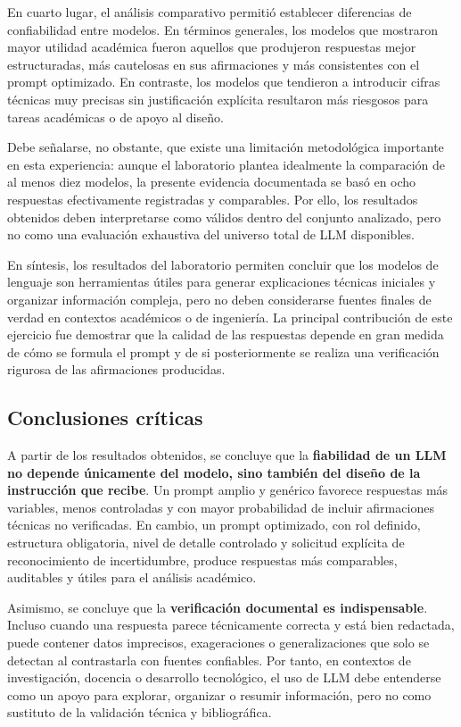 \documentclass[11pt,a4paper]{article}
\begin{document}
En cuarto lugar, el análisis comparativo permitió establecer diferencias de confiabilidad entre modelos. En términos generales, los modelos que mostraron mayor utilidad académica fueron aquellos que produjeron respuestas mejor estructuradas, más cautelosas en sus afirmaciones y más consistentes con el prompt optimizado. En contraste, los modelos que tendieron a introducir cifras técnicas muy precisas sin justificación explícita resultaron más riesgosos para tareas académicas o de apoyo al diseño.

Debe señalarse, no obstante, que existe una limitación metodológica importante en esta experiencia: aunque el laboratorio plantea idealmente la comparación de al menos diez modelos, la presente evidencia documentada se basó en ocho respuestas efectivamente registradas y comparables. Por ello, los resultados obtenidos deben interpretarse como válidos dentro del conjunto analizado, pero no como una evaluación exhaustiva del universo total de LLM disponibles.

En síntesis, los resultados del laboratorio permiten concluir que los modelos de lenguaje son herramientas útiles para generar explicaciones técnicas iniciales y organizar información compleja, pero no deben considerarse fuentes finales de verdad en contextos académicos o de ingeniería. La principal contribución de este ejercicio fue demostrar que la calidad de las respuestas depende en gran medida de cómo se formula el prompt y de si posteriormente se realiza una verificación rigurosa de las afirmaciones producidas.

\subsection{Conclusiones críticas}

A partir de los resultados obtenidos, se concluye que la \textbf{fiabilidad de un LLM no depende únicamente del modelo, sino también del diseño de la instrucción que recibe}. Un prompt amplio y genérico favorece respuestas más variables, menos controladas y con mayor probabilidad de incluir afirmaciones técnicas no verificadas. En cambio, un prompt optimizado, con rol definido, estructura obligatoria, nivel de detalle controlado y solicitud explícita de reconocimiento de incertidumbre, produce respuestas más comparables, auditables y útiles para el análisis académico.

Asimismo, se concluye que la \textbf{verificación documental es indispensable}. Incluso cuando una respuesta parece técnicamente correcta y está bien redactada, puede contener datos imprecisos, exageraciones o generalizaciones que solo se detectan al contrastarla con fuentes confiables. Por tanto, en contextos de investigación, docencia o desarrollo tecnológico, el uso de LLM debe entenderse como un apoyo para explorar, organizar o resumir información, pero no como sustituto de la validación técnica y bibliográfica.
\end{document}
